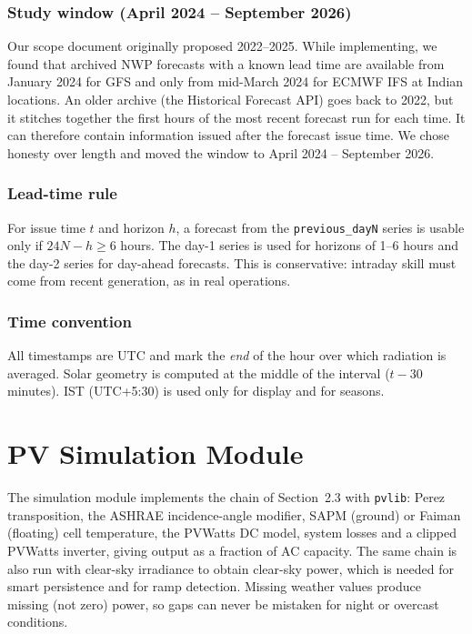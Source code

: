 \documentclass[12pt]{report}
\begin{document}
\subsubsection{Study window (April 2024 -- September 2026)}
Our scope document originally proposed 2022--2025. While implementing, we found that archived NWP forecasts with a known lead time are available from January 2024 for GFS and only from mid-March 2024 for ECMWF IFS at Indian locations. An older archive (the Historical Forecast API) goes back to 2022, but it stitches together the first hours of the most recent forecast run for each time. It can therefore contain information issued after the forecast issue time. We chose honesty over length and moved the window to April 2024 -- September 2026.

\subsubsection{Lead-time rule}
For issue time $t$ and horizon $h$, a forecast from the \texttt{previous\_dayN} series is usable only if $24N - h \geq 6$ hours. The day-1 series is used for horizons of 1--6 hours and the day-2 series for day-ahead forecasts. This is conservative: intraday skill must come from recent generation, as in real operations.

\subsubsection{Time convention}
All timestamps are UTC and mark the \textit{end} of the hour over which radiation is averaged. Solar geometry is computed at the middle of the interval ($t - 30$ minutes). IST (UTC+5:30) is used only for display and for seasons.

\section{PV Simulation Module}
\vspace{1mm}
The simulation module implements the chain of Section~2.3 with \texttt{pvlib}: Perez transposition, the ASHRAE incidence-angle modifier, SAPM (ground) or Faiman (floating) cell temperature, the PVWatts DC model, system losses and a clipped PVWatts inverter, giving output as a fraction of AC capacity. The same chain is also run with clear-sky irradiance to obtain clear-sky power, which is needed for smart persistence and for ramp detection.
Missing weather values produce missing (not zero) power, so gaps can never be mistaken for night or overcast conditions.
\end{document}
